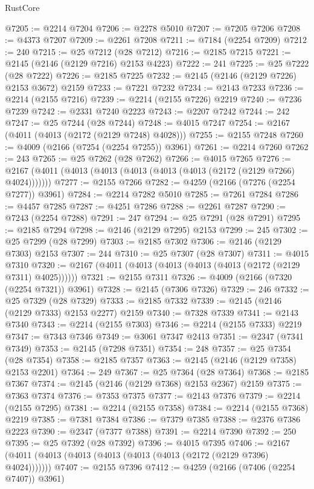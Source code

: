 \begin{lexlean}{RustCore}
\begin{coremodule}
@7205 := @2214 @7204
@7206 := @2278 @5010
@7207 := @7205 @7206
@7208 := @4373 @7207
@7209 := @2261 @7208
@7211 := @7184 (@2254 @7209)
@7212 := 240
@7215 := @25 @7212 (@28 @7212)
@7216 := @2185 @7215
@7221 := @2145 (@2146 (@2129 @7216) @2153 @4223)
@7222 := 241
@7225 := @25 @7222 (@28 @7222)
@7226 := @2185 @7225
@7232 := @2145 (@2146 (@2129 @7226) @2153 @3672) @2159
@7233 := @7221 @7232
@7234 := @2143 @7233
@7236 := @2214 (@2155 @7216)
@7239 := @2214 (@2155 @7226) @2219
@7240 := @7236 @7239
@7242 := @2331 @7240 @2223
@7243 := @2207 @7242
@7244 := 242
@7247 := @25 @7244 (@28 @7244)
@7248 := @4015 @7247
@7254 := @2167 (@4011 (@4013 (@2172 (@2129 @7248) @4028)))
@7255 := @2155 @7248
@7260 := @4009 (@2166 (@7254 (@2254 @7255)) @3961)
@7261 := @2214 @7260
@7262 := 243
@7265 := @25 @7262 (@28 @7262)
@7266 := @4015 @7265
@7276 := @2167 (@4011 (@4013 (@4013 (@4013 (@4013 (@4013 (@2172 (@2129 @7266) @4024)))))))
@7277 := @2155 @7266
@7282 := @4259 (@2166 (@7276 (@2254 @7277)) @3961)
@7284 := @2214 @7282 @5010
@7285 := @7261 @7284
@7286 := @4457 @7285
@7287 := @4251 @7286
@7288 := @2261 @7287
@7290 := @7243 (@2254 @7288)
@7291 := 247
@7294 := @25 @7291 (@28 @7291)
@7295 := @2185 @7294
@7298 := @2146 (@2129 @7295) @2153
@7299 := 245
@7302 := @25 @7299 (@28 @7299)
@7303 := @2185 @7302
@7306 := @2146 (@2129 @7303) @2153
@7307 := 244
@7310 := @25 @7307 (@28 @7307)
@7311 := @4015 @7310
@7320 := @2167 (@4011 (@4013 (@4013 (@4013 (@4013 (@2172 (@2129 @7311) @4025))))))
@7321 := @2155 @7311
@7326 := @4009 (@2166 (@7320 (@2254 @7321)) @3961)
@7328 := @2145 (@7306 @7326)
@7329 := 246
@7332 := @25 @7329 (@28 @7329)
@7333 := @2185 @7332
@7339 := @2145 (@2146 (@2129 @7333) @2153 @2277) @2159
@7340 := @7328 @7339
@7341 := @2143 @7340
@7343 := @2214 (@2155 @7303)
@7346 := @2214 (@2155 @7333) @2219
@7347 := @7343 @7346
@7349 := @3061 @7347 @2413
@7351 := @2347 (@7341 @7349)
@7353 := @2145 (@7298 @7351)
@7354 := 248
@7357 := @25 @7354 (@28 @7354)
@7358 := @2185 @7357
@7363 := @2145 (@2146 (@2129 @7358) @2153 @2201)
@7364 := 249
@7367 := @25 @7364 (@28 @7364)
@7368 := @2185 @7367
@7374 := @2145 (@2146 (@2129 @7368) @2153 @2367) @2159
@7375 := @7363 @7374
@7376 := @7353 @7375
@7377 := @2143 @7376
@7379 := @2214 (@2155 @7295)
@7381 := @2214 (@2155 @7358)
@7384 := @2214 (@2155 @7368) @2219
@7385 := @7381 @7384
@7386 := @7379 @7385
@7388 := @2376 @7386 @2223
@7390 := @2347 (@7377 @7388)
@7391 := @2214 @7390
@7392 := 250
@7395 := @25 @7392 (@28 @7392)
@7396 := @4015 @7395
@7406 := @2167 (@4011 (@4013 (@4013 (@4013 (@4013 (@4013 (@2172 (@2129 @7396) @4024)))))))
@7407 := @2155 @7396
@7412 := @4259 (@2166 (@7406 (@2254 @7407)) @3961)

\end{coremodule}
\end{lexlean}
